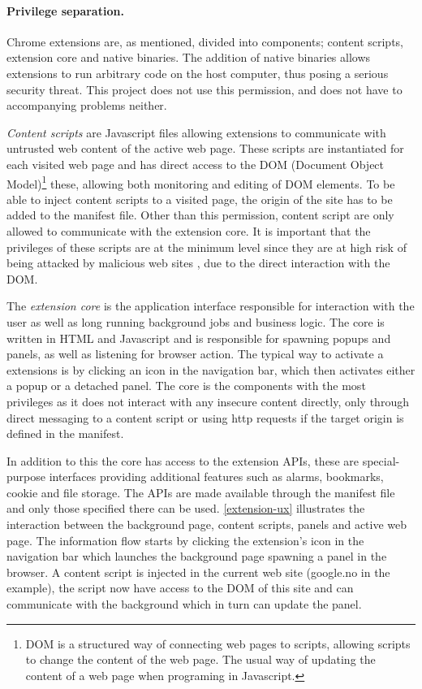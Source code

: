 \paragraph{Privilege separation.} Chrome extensions are, as mentioned, divided into components; content scripts, extension core and native binaries. The addition of native binaries allows extensions to run arbitrary code on the host computer, thus posing a serious security threat. This project does not use this permission, and does not have to accompanying problems neither. 
\par \emph{Content scripts} are Javascript files allowing extensions to communicate with untrusted web content of the active web page. These scripts are instantiated for each visited web page and has direct access to the DOM (Document Object Model)\footnote{DOM is a structured way of connecting web pages to scripts, allowing scripts to change the content of the web page. The usual way of updating the content of a web page when programing in Javascript.} these, allowing both monitoring and editing of DOM elements. To be able to inject content scripts to a visited page, the origin of the site has to be added to the manifest file. Other than this permission, content script are only allowed to communicate with the extension core. It is important that the privileges of these scripts are at the minimum level since they are at high risk of being attacked by malicious web sites \cite{chrome-extension-dangers}, due to the direct interaction with the DOM. 
\par The \emph{extension core} is the application interface responsible for interaction with the user as well as long running background jobs and business logic. The core is written in HTML and Javascript and is responsible for spawning popups and panels, as well as listening for browser action. The typical way to activate a extensions is by clicking an icon in the navigation bar, which then activates either a popup or a detached panel. The core is the components with the most privileges as it does not interact with any insecure content directly, only through direct messaging to a content script or using http requests if the target origin is defined in the manifest. 
\par In addition to this the core has access to the extension APIs, these are special-purpose interfaces providing additional features such as alarms, bookmarks, cookie and file storage. The APIs are made available through the manifest file and only those specified there can be used. \autoref{extension-ux} illustrates the interaction between the background page, content scripts, panels and active web page. The information flow starts by clicking the extension's icon in the navigation bar which launches the background page spawning a panel in the browser. A content script is injected in the current web site (google.no in the example), the script now have access to the DOM of this site and can communicate with the background which in turn can update the panel. 



